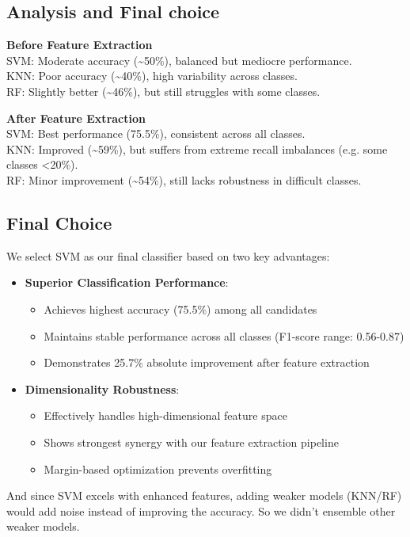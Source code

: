 \documentclass[a4paper,11pt]{article}
\begin{document}
\subsection{Analysis and Final choice}

\textbf{Before Feature Extraction}
\\SVM: Moderate accuracy (\textasciitilde50\%), balanced but mediocre performance.
\\KNN: Poor accuracy (\textasciitilde40\%), high variability across classes.
\\RF: Slightly better (\textasciitilde46\%), but still struggles with some classes.

\textbf{After Feature Extraction}
\\SVM: Best performance (75.5\%), consistent across all classes.
\\KNN: Improved (\textasciitilde59\%), but suffers from extreme recall imbalances (e.g. some classes <20\%).
\\RF: Minor improvement (\textasciitilde54\%), still lacks robustness in difficult classes.

\subsection{Final Choice}
We select SVM as our final classifier based on two key advantages:

\begin{itemize}
    \item \textbf{Superior Classification Performance}:
    \begin{itemize}
        \item Achieves highest accuracy (75.5\%) among all candidates
        \item Maintains stable performance across all classes (F1-score range: 0.56-0.87)
        \item Demonstrates 25.7\% absolute improvement after feature extraction
    \end{itemize}
    
    \item \textbf{Dimensionality Robustness}:
    \begin{itemize}
        \item Effectively handles high-dimensional feature space
        \item Shows strongest synergy with our feature extraction pipeline
        \item Margin-based optimization prevents overfitting
    \end{itemize}
\end{itemize}
And since SVM excels with enhanced features, adding weaker models (KNN/RF) would add noise instead of improving the accuracy. So we didn't ensemble other weaker models.
\end{document}
